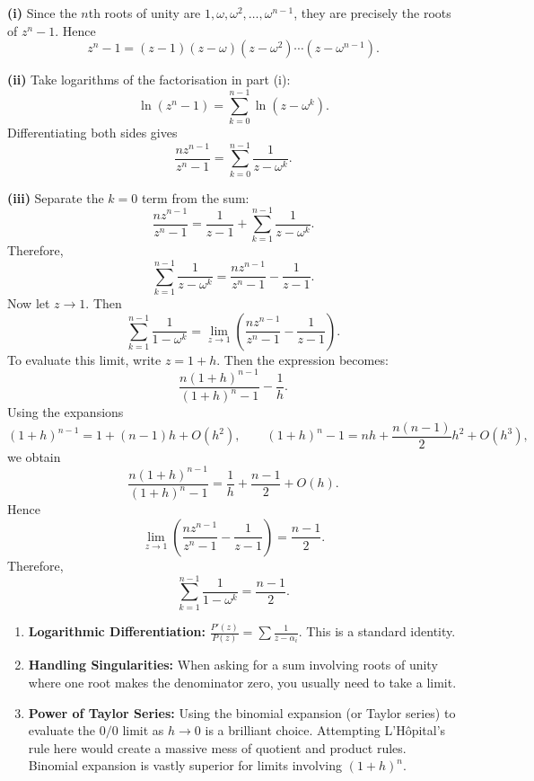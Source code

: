 \begin{solution}
\textbf{(i)} Since the $n$th roots of unity are $1,\omega,\omega^2,\dots,\omega^{n-1}$, they are precisely the roots of $z^n-1$. Hence
\[
z^n-1=(z-1)(z-\omega)(z-\omega^2)\cdots(z-\omega^{n-1}).
\]

\textbf{(ii)} Take logarithms of the factorisation in part (i):
\[
\ln(z^n-1)=\sum_{k=0}^{n-1}\ln(z-\omega^k).
\]
Differentiating both sides gives
\[
\frac{n z^{n-1}}{z^n-1}=\sum_{k=0}^{n-1}\frac{1}{z-\omega^k}.
\]

\textbf{(iii)} Separate the $k=0$ term from the sum:
\[
\frac{n z^{n-1}}{z^n-1}=\frac{1}{z-1}+\sum_{k=1}^{n-1}\frac{1}{z-\omega^k}.
\]
Therefore,
\[
\sum_{k=1}^{n-1}\frac{1}{z-\omega^k}
=\frac{n z^{n-1}}{z^n-1}-\frac{1}{z-1}.
\]
Now let $z\to1$. Then
\[
\sum_{k=1}^{n-1}\frac{1}{1-\omega^k}
=\lim_{z\to1}\left(\frac{n z^{n-1}}{z^n-1}-\frac{1}{z-1}\right).
\]
To evaluate this limit, write $z=1+h$. Then the expression becomes:
\[
\frac{n(1+h)^{n-1}}{(1+h)^n-1}-\frac{1}{h}.
\]
Using the expansions
\[
(1+h)^{n-1}=1+(n-1)h+O(h^2),\qquad
(1+h)^n-1=nh+\frac{n(n-1)}{2}h^2+O(h^3),
\]
we obtain
\[
\frac{n(1+h)^{n-1}}{(1+h)^n-1}
=\frac{1}{h}+\frac{n-1}{2}+O(h).
\]
Hence
\[
\lim_{z\to1}\left(\frac{n z^{n-1}}{z^n-1}-\frac{1}{z-1}\right)=\frac{n-1}{2}.
\]
Therefore,
\[
\sum_{k=1}^{n-1}\frac{1}{1-\omega^k}=\frac{n-1}{2}.
\]
\end{solution}

\begin{takeaways}
\begin{enumerate}
    \item \textbf{Logarithmic Differentiation:} $\frac{P'(z)}{P(z)} = \sum \frac{1}{z - \alpha_i}$. This is a standard identity.
    \item \textbf{Handling Singularities:} When asking for a sum involving roots of unity where one root makes the denominator zero, you usually need to take a limit.
    \item \textbf{Power of Taylor Series:} Using the binomial expansion (or Taylor series) to evaluate the $0/0$ limit as $h \to 0$ is a brilliant choice. Attempting L'Hôpital's rule here would create a massive mess of quotient and product rules. Binomial expansion is vastly superior for limits involving $(1+h)^n$.
\end{enumerate}
\end{takeaways}

